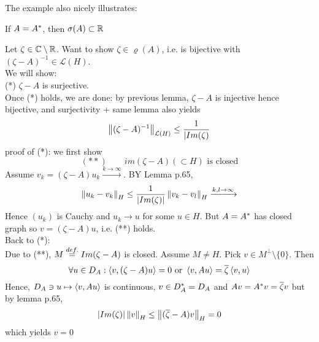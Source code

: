 The example also nicely illustrates:
\begin{proposition}
	If $A={A}^*$, then $\sigma(A)\subset \mathbb{R}$
	\begin{pf}{}{}
		Let $\zeta\in\mathbb{C}\setminus\mathbb{R}$. Want to show $\zeta\in\varrho(A)$, i.e.  is bijective with $(\zeta-A)^{-1}\in\mathcal{L}(H)$.\\
		We will show:\\
		(*) $\zeta-A$ is surjective.\\
		Once  (*) holds, we are done: by previous lemma, $\zeta-A$ is injective hence bijective, and surjectivity + same lemma also yields
		$$
			\left\|{(\zeta-A)^{-1}}\right\|_{\mathcal{L}(H)}\leq\frac{1}{|Im(\zeta)}
		$$
		proof of (*): we first show
		$$
			(**)\qquad im(\zeta-A)(\subset H) \text{  is closed}
		$$
		Assume $v_k=(\zeta-A)u_k\xrightarrow{k\to\infty}$. BY Lemma p.65,
		$$
			\left\|{u_k-v_k}\right\|_H\leq\frac{1}{|Im(\zeta)|}\left\|{v_k-v_l}\right\|_H\xrightarrow{k,l\to\infty}$$Hence $(u_k)$ is Cauchy and $u_k\to u$ for some $u\in H$. But $A={A}^*$ has closed graph so $v=(\zeta-A)u$, i.e. (**) holds.\\
		Back to (*):\\
		Due to (**), $M\stackrel{def.}{=} Im(\zeta-A)$ is closed. Assume $M\neq H$. Pick $v\in M^\perp\setminus\{0\}$. Then
		$$
			\forall u\in D_A:\left<{v},{(\zeta-A)u}\right>=0\text{  or  }\left<{v},{Au}\right>=\overline{\zeta}\left<{v},{u}\right>$$
		Hence,
		$
			D_A\ni u\mapsto \left<{v},{Au}\right>
		$
		is continuous, $v\in D_{A}^*=D_A$ and $Av={A}^*v=\overline{\zeta}v$
		but by lemma p.65,
		$$|Im(\zeta)|\left\|{v}\right\|_H\leq\left\|{(\overline{\zeta}-A)v}\right\|_H=0$$
		which yields $v=0 $
	\end{pf}
\end{proposition}
